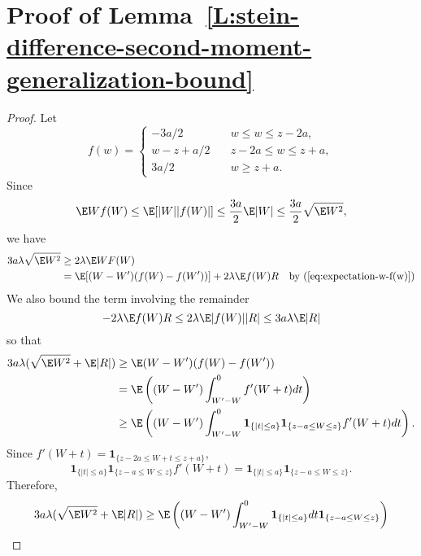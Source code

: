 \section{Proof of  Lemma~\ref{L:stein-difference-second-moment-generalization-bound}}
\begin{proof}
  Let
  \begin{equation*}
    f(w) =
    \begin{cases}
      -3a / 2 &\quad w \leq w \leq z - 2a, \\
      w - z + a / 2 &\quad z - 2a \leq w \leq z + a, \\
      3a / 2 &\quad w \geq z + a.
    \end{cases}
  \end{equation*}
  Since
  \begin{equation*}
    \E W f(W) \leq \E [|W| |f(W)|] \leq \frac{3a}{2} \E |W| \leq \frac{3a}{2} \sqrt{\E W^2},
  \end{equation*}
  we have
  \begin{align*}
    3a \lambda \sqrt{\E W^2} &\geq 2\lambda \E WF(W) \\
    &= \E [(W-W')(f(W)-f(W'))] + 2 \lambda \E f(W)R \quad \text{by } (\ref{eq:expectation-w-f(w)})
  \end{align*}
  We also bound the term involving the remainder
  \begin{equation*}
    -2 \lambda \E f(W)R  \leq 2 \lambda \E |f(W)| |R| \leq 3a \lambda \E |R|
  \end{equation*}
  so that
  \begin{align*}
    3a \lambda (\sqrt{\E W^2} + \E |R|) &\geq \E (W-W')(f(W)-f(W')) \\
    &= \E \left ( (W-W') \int_{W'-W}^{0} f'(W+t)dt \right ) \\
    &\geq \E \left( (W-W') \int_{W'-W}^0 \mathbf{1}_{\{|t| \leq a\}}
    \mathbf{1}_{\{z - a \leq W \leq z\}} f'(W + t) dt \right ).
  \end{align*}
  Since $f'(W + t) = \mathbf{1}_{\{z - 2a \leq W + t \leq z + a \}}$,
  \begin{equation*}
    \mathbf{1}_{\{|t| \leq a\}} \mathbf{1}_{\{z - a \leq W \leq z\}} f'(W + t) =
    \mathbf{1}_{\{|t| \leq a\}} \mathbf{1}_{\{z - a \leq W \leq z\}}.
  \end{equation*}
  Therefore,
  \begin{align*}
    3a \lambda (\sqrt{\E W^2} + \E |R|) &\geq
    \E \left( (W-W') \int_{W'-W}^0 \mathbf{1}_{\{|t| \leq a\}} dt
    \mathbf{1}_{\{z - a \leq W \leq z\}} \right ) \\

\end{align*}
\end{proof}
